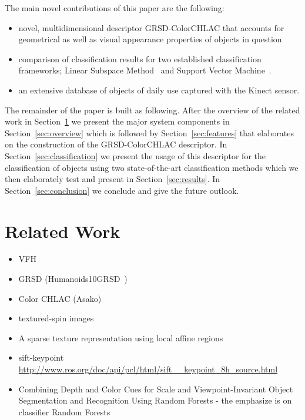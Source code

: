 \documentclass[conference]{sty/IEEEtran}
\begin{document}
The main novel contributions of this paper are the following:
\begin{itemize}
\item novel, multidimensional descriptor GRSD-ColorCHLAC that accounts for
geometrical as well as visual appearance  properties of objects in question
\item comparison of classification results for two established classification
frameworks; Linear Subspace Method~\cite{watanabe1973} and Support Vector Machine~\cite{svm99}.
\item an extensive database of objects of daily use captured with the Kinect sensor.
\end{itemize}

The remainder of the paper is built as following. After the overview of the related
work in Section~\ref{sec:rl} we present the major system components in Section~\ref{sec:overview}
which is followed by Section~\ref{sec:features} that elaborates on the construction of the
GRSD-ColorCHLAC descriptor. In Section~\ref{sec:classification} we present the usage of this descriptor
for the classification of objects using two state-of-the-art classification methods which we
then elaborately test and present in Section~\ref{sec:results}. In Section~\ref{sec:conclusion}
we conclude and give the future outlook.

\section{Related Work}
\label{sec:rl}
\begin{itemize}
\item VFH~\cite{vfh}
\item GRSD (Humanoids10GRSD~)\cite{GRSD10Humanoids}
\item Color CHLAC (Asako)~\cite{kanezaki2010icra}\cite{kanezaki2010tvc}
\item textured-spin images~\cite{Johnson_spin_images}
\item A sparse texture representation using local affine regions~\cite{Lazebnik05asparse}
\item sift-keypoint \url{http://www.ros.org/doc/api/pcl/html/sift__keypoint_8h_source.html}
\item Combining Depth and Color Cues for Scale and Viewpoint-Invariant
Object Segmentation and Recognition Using Random Forests - the emphasize is on classifier Random Forests~\cite{stueckler10combining}
\end{itemize}
\end{document}

